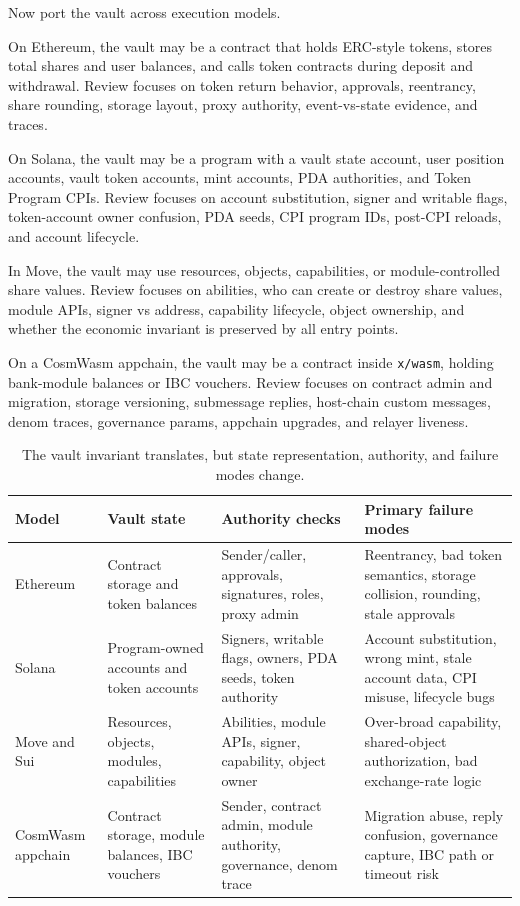 Now port the vault across execution models.

On Ethereum, the vault may be a contract that holds ERC-style tokens, stores total shares and user balances, and calls token contracts during deposit and withdrawal. Review focuses on token return behavior, approvals, reentrancy, share rounding, storage layout, proxy authority, event-vs-state evidence, and traces.

On Solana, the vault may be a program with a vault state account, user position accounts, vault token accounts, mint accounts, PDA authorities, and Token Program CPIs. Review focuses on account substitution, signer and writable flags, token-account owner confusion, PDA seeds, CPI program IDs, post-CPI reloads, and account lifecycle.

In Move, the vault may use resources, objects, capabilities, or module-controlled share values. Review focuses on abilities, who can create or destroy share values, module APIs, signer vs address, capability lifecycle, object ownership, and whether the economic invariant is preserved by all entry points.

On a CosmWasm appchain, the vault may be a contract inside \texttt{x/wasm}, holding bank-module balances or IBC vouchers. Review focuses on contract admin and migration, storage versioning, submessage replies, host-chain custom messages, denom traces, governance params, appchain upgrades, and relayer liveness.

\begin{table}[htbp]
\centering
\small
\renewcommand{\arraystretch}{1.18}
\begin{tabularx}{\textwidth}{@{}>{\RaggedRight\arraybackslash}p{}>{\RaggedRight\arraybackslash}p{}>{\RaggedRight\arraybackslash}p{}>{\RaggedRight\arraybackslash}X@{}}
\toprule
Model & Vault state & Authority checks & Primary failure modes \\
\midrule
Ethereum & Contract storage and token balances & Sender/caller, approvals, signatures, roles, proxy admin & Reentrancy, bad token semantics, storage collision, rounding, stale approvals \\
Solana & Program-owned accounts and token accounts & Signers, writable flags, owners, PDA seeds, token authority & Account substitution, wrong mint, stale account data, CPI misuse, lifecycle bugs \\
Move and Sui & Resources, objects, modules, capabilities & Abilities, module APIs, signer, capability, object owner & Over-broad capability, shared-object authorization, bad exchange-rate logic \\
CosmWasm appchain & Contract storage, module balances, IBC vouchers & Sender, contract admin, module authority, governance, denom trace & Migration abuse, reply confusion, governance capture, IBC path or timeout risk \\
\bottomrule
\end{tabularx}
\caption{The vault invariant translates, but state representation, authority, and failure modes change.}
\end{table}

